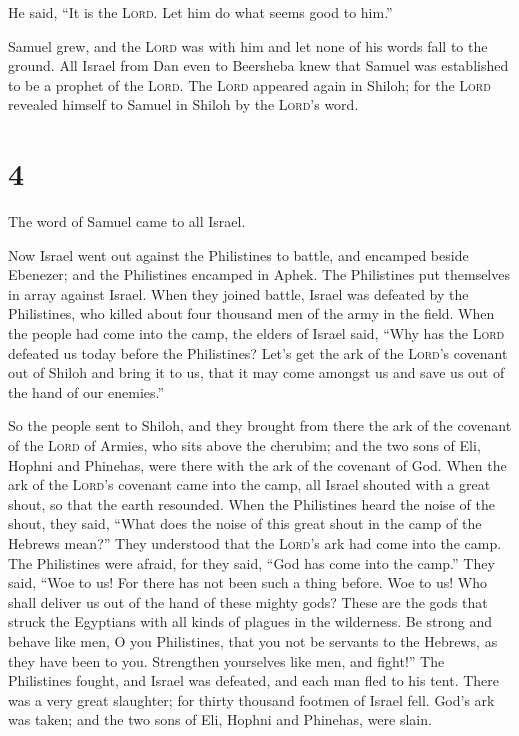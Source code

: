 He said, ``It is the \textsc{Lord}. Let him do what seems good to him.''

 Samuel grew, and the \textsc{Lord} was with him and let
none of his words fall to the ground.  All Israel from
Dan even to Beersheba knew that Samuel was established to be a prophet
of the \textsc{Lord}.  The \textsc{Lord} appeared again
in Shiloh; for the \textsc{Lord} revealed himself to Samuel in Shiloh by
the \textsc{Lord}'s word.

\hypertarget{section-3}{%
\section{4}\label{section-3}}

 The word of Samuel came to all Israel.

Now Israel went out against the Philistines to battle, and encamped
beside Ebenezer; and the Philistines encamped in Aphek. 
The Philistines put themselves in array against Israel. When they joined
battle, Israel was defeated by the Philistines, who killed about four
thousand men of the army in the field.  When the people
had come into the camp, the elders of Israel said, ``Why has the
\textsc{Lord} defeated us today before the Philistines? Let's get the
ark of the \textsc{Lord}'s covenant out of Shiloh and bring it to us,
that it may come amongst us and save us out of the hand of our
enemies.''

 So the people sent to Shiloh, and they brought from there
the ark of the covenant of the \textsc{Lord} of Armies, who sits above
the cherubim; and the two sons of Eli, Hophni and Phinehas, were there
with the ark of the covenant of God.  When the ark of the
\textsc{Lord}'s covenant came into the camp, all Israel shouted with a
great shout, so that the earth resounded.  When the
Philistines heard the noise of the shout, they said, ``What does the
noise of this great shout in the camp of the Hebrews mean?'' They
understood that the \textsc{Lord}'s ark had come into the camp.
 The Philistines were afraid, for they said, ``God has
come into the camp.'' They said, ``Woe to us! For there has not been
such a thing before.  Woe to us! Who shall deliver us out
of the hand of these mighty gods? These are the gods that struck the
Egyptians with all kinds of plagues in the wilderness.  Be
strong and behave like men, O you Philistines, that you not be servants
to the Hebrews, as they have been to you. Strengthen yourselves like
men, and fight!''  The Philistines fought, and Israel was
defeated, and each man fled to his tent. There was a very great
slaughter; for thirty thousand footmen of Israel fell. 
God's ark was taken; and the two sons of Eli, Hophni and Phinehas, were
slain.

